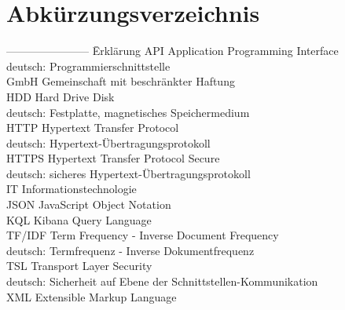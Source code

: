 \documentclass[a4paper]{scrartcl}
\begin{document}
\thispagestyle{empty}




\newpage


\setcounter{page}{2}

\tableofcontents



\newpage

\section*{Abkürzungsverzeichnis}


\begin{tabbing}
	----------------------- \= Erklärung \kill
	API \> Application Programming Interface \\
	\> deutsch: Programmierschnittstelle \\
	GmbH \> Gemeinschaft mit beschränkter Haftung \\
	HDD \> Hard Drive Disk \\
	\> deutsch: Festplatte, magnetisches Speichermedium  \\
	HTTP \> Hypertext Transfer Protocol \\
	\> deutsch: Hypertext-Übertragungsprotokoll \\
	HTTPS \> Hypertext Transfer Protocol Secure \\
	\> deutsch: sicheres Hypertext-Übertragungsprotokoll \\
	IT \> Informationstechnologie \\
	JSON \> JavaScript Object Notation \\
	KQL \> Kibana Query Language \\
	TF/IDF \> Term Frequency - Inverse Document Frequency \\
	\> deutsch: Termfrequenz - Inverse Dokumentfrequenz \\
	TSL \> Transport Layer Security \\
	\> deutsch: Sicherheit auf Ebene der Schnittstellen-Kommunikation \\
	XML \> Extensible Markup Language \\
\end{tabbing}
\end{document}
